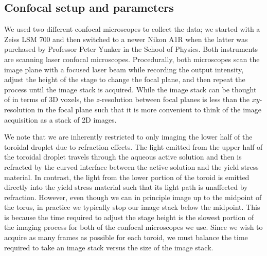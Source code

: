 \subsection{Confocal setup and parameters}
We used two different confocal microscopes to collect the data; we started with a Zeiss LSM 700 and then switched to a newer Nikon A1R when the latter was purchased by Professor Peter Yunker in the School of Physics.
Both instruments are scanning laser confocal microscopes.
Procedurally, both microscopes scan the image plane with a focused laser beam while recording the output intensity, adjust the height of the stage to change the focal plane, and then repeat the process until the image stack is acquired.
While the image stack can be thought of in terms of 3D voxels, the $z$-resolution between focal planes is less than the $xy$-resolution in the focal plane such that it is more convenient to think of the image acquisition as a stack of 2D images.

We note that we are inherently restricted to only imaging the lower half of the toroidal droplet due to refraction effects.
The light emitted from the upper half of the toroidal droplet travels through the aqueous active solution and then is refracted by the curved interface between the active solution and the yield stress material.
In contrast, the light from the lower portion of the toroid is emitted directly into the yield stress material such that its light path is unaffected by refraction.
However, even though we can in principle image up to the midpoint of the torus, in practice we typically stop our image stack below the midpoint.
This is because the time required to adjust the stage height is the slowest portion of the imaging process for both of the confocal microscopes we use.
Since we wish to acquire as many frames as possible for each toroid, we must balance the time required to take an image stack versus the size of the image stack.


